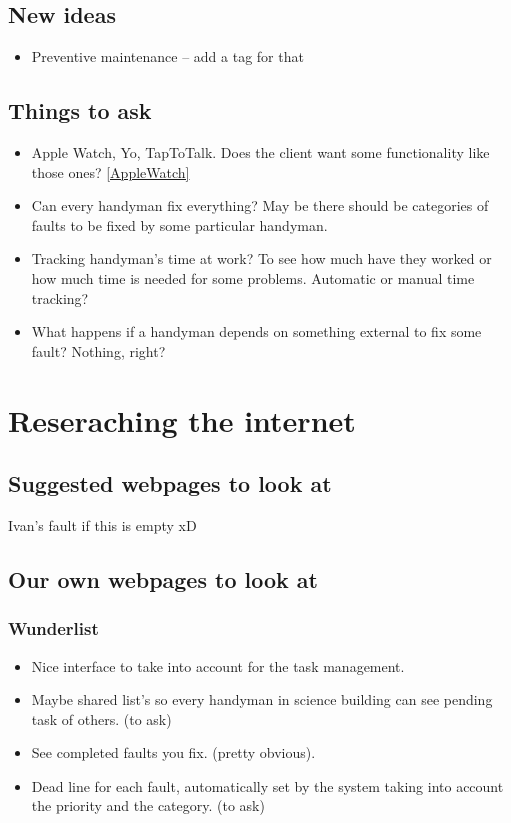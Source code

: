 
\section{New ideas}
\begin{itemize}
\item Preventive maintenance – add a tag for that
\end{itemize}

\section{Things to ask}

\begin{itemize}
\item Apple Watch, Yo, TapToTalk. Does the client want some functionality like those ones? \ref{AppleWatch}

\item Can every handyman fix everything? May be there should be categories of faults to be fixed by some particular handyman.
\item Tracking handyman's time at work? To see how much have they worked or how much time is needed for some problems. Automatic or manual time tracking?
\item What happens if a handyman depends on something external to fix some fault? Nothing, right?
\end{itemize}

\chapter{Reseraching the internet}

\section{Suggested webpages to look at}

Ivan's fault if this is empty xD

\section{Our own webpages to look at}

\subsection{Wunderlist}

\begin{itemize}
\item Nice interface to take into account for the task management.
\item Maybe shared list's so every handyman in science building can see pending task of others. (to ask)
\item See completed faults you fix. (pretty obvious).
\item Dead line for each fault, automatically set by the system taking into account the priority and the category. (to ask)
\end{itemize}



